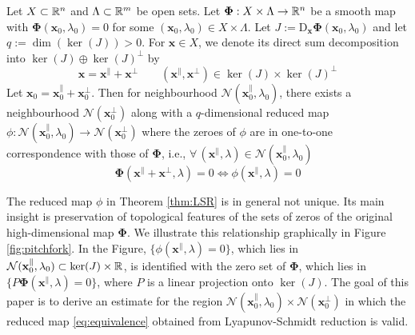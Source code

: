 \documentclass[letterpaper, 10 pt, conference, dvipsnames]{ieeeconf}
\begin{document}
\thm\label{thm:LSR} Let \(X\subset\R[n]\) and \(\Lambda\subset\R[m]\) be open sets. Let \(\boldsymbol{\Phi}:X\times\Lambda\to\R[n]\) be a smooth map with \(\boldsymbol{\Phi}(\mathbf{x}_0,\lambda_0) = 0\) for some \((\mathbf{x}_0,\lambda_0)\in X\times\Lambda\). Let \(J := \mathrm{D}_\mathbf{x}\boldsymbol{\Phi}(\mathbf{x}_0,\lambda_0)\) and let \(q := \dim(\ker(J)) > 0\). For \(\mathbf{x}\in X\), we denote its direct sum decomposition into \(\ker(J)\oplus\ker(J)^\perp\) by
\begin{equation}
    \mathbf{x} = \mathbf{x}^\parallel+\mathbf{x}^\perp\qquad(\mathbf{x}^\parallel,\mathbf{x}^\perp)\in\ker(J)\times\ker(J)^{\perp} \label{def:decompose}
\end{equation}
Let \(\mathbf{x}_0 = \mathbf{x}^\parallel_0+\mathbf{x}^\perp_0\). Then for neighbourhood \({\mathcal{N}}(\mathbf{x}^\parallel_0,\lambda_0)\), there exists a neighbourhood \({\mathcal{N}}(\mathbf{x}^\perp_0)\) along with a \(q\)-dimensional reduced map \(\phi:{\mathcal{N}}(\mathbf{x}^\parallel_0,\lambda_0)\to{\mathcal{N}}(\mathbf{x}^\perp_0)\) where the zeroes of \(\phi\) are in one-to-one correspondence with those of \(\boldsymbol{\Phi}\), i.e., \(\forall\,(\mathbf{x}^\parallel,\lambda)\in{\mathcal{N}}(\mathbf{x}^\parallel_0,\lambda_0)\)
\begin{equation}
    \boldsymbol{\Phi}(\mathbf{x}^\parallel+\mathbf{x}^\perp,\lambda) = 0\iff\phi(\mathbf{x}^\parallel,\lambda) = 0 \label{eq:equivalence}
\end{equation}

The reduced map \(\phi\) in Theorem \ref{thm:LSR} is in general not unique. Its main insight is preservation of topological features of the sets of zeros of the original high-dimensional map \(\boldsymbol{\Phi}\). We illustrate this relationship graphically in Figure \ref{fig:pitchfork}. In the Figure, \(\{\phi(\mathbf{x}^\parallel,\lambda) = 0\}\), which lies in \({\mathcal{N}}(\mathbf{x}^\parallel_0,\lambda_0)\subset\ker(J)\times\R\), is identified with the zero set of \(\boldsymbol{\Phi}\), which lies in \(\{P\boldsymbol{\Phi}(\mathbf{x}^\parallel,\lambda) = 0\}\), where \(P\) is a linear projection onto \(\ker(J)\). The goal of this paper is to derive an estimate for the region \({\mathcal{N}}(\mathbf{x}^\parallel_0,\lambda_0)\times{\mathcal{N}}(\mathbf{x}^\perp_0)\) in which the reduced map \eqref{eq:equivalence} obtained from {Lyapunov-Schmidt} reduction is valid.
\end{document}
